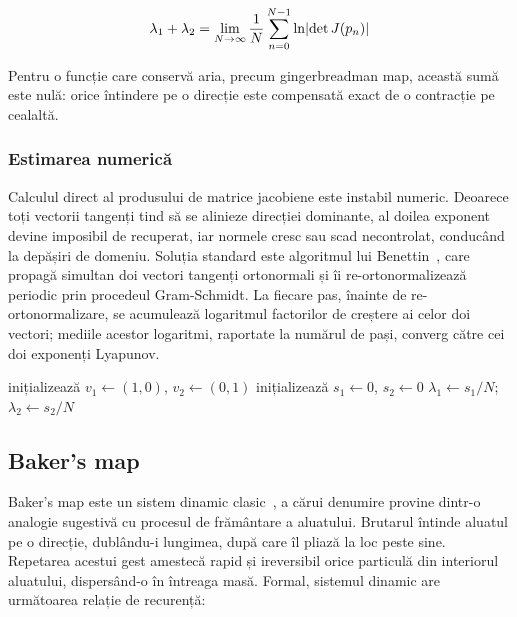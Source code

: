 \begin{equation}
    \lambda_1 + \lambda_2 = \lim_{N \to \infty} \frac{1}{N} \sum_{n=0}^{N-1} \ln \lvert\det J(p_n)\rvert
\end{equation}

Pentru o funcție care conservă aria, precum gingerbreadman map, această sumă este nulă: orice întindere pe o direcție este compensată exact de o contracție pe cealaltă.

\subsubsection{Estimarea numerică}

Calculul direct al produsului de matrice jacobiene este instabil numeric.
Deoarece toți vectorii tangenți tind să se alinieze direcției dominante, al doilea exponent devine imposibil de recuperat, iar normele cresc sau scad necontrolat, conducând la depășiri de domeniu.
Soluția standard este algoritmul lui Benettin~\cite{benettin1980}, care propagă simultan doi vectori tangenți ortonormali și îi re-ortonormalizează periodic prin procedeul Gram-Schmidt.
La fiecare pas, înainte de re-ortonormalizare, se acumulează logaritmul factorilor de creștere ai celor doi vectori; mediile acestor logaritmi, raportate la numărul de pași, converg către cei doi exponenți Lyapunov.

\begin{algorithm}[H]
    inițializează $v_1 \gets (1, 0)$, $v_2 \gets (0, 1)$\;
    inițializează $s_1 \gets 0$, $s_2 \gets 0$\;
    $\lambda_1 \gets s_1 / N$;\quad $\lambda_2 \gets s_2 / N$\;
    \caption{Estimarea spectrului Lyapunov~\cite{benettin1980}}
\end{algorithm}

\subsection{Baker's map}

Baker's map este un sistem dinamic clasic~\cite{devaney1989}, a cărui denumire provine dintr-o analogie sugestivă cu procesul de frământare a aluatului.
Brutarul întinde aluatul pe o direcție, dublându-i lungimea, după care îl pliază la loc peste sine.
Repetarea acestui gest amestecă rapid și ireversibil orice particulă din interiorul aluatului, dispersând-o în întreaga masă.
Formal, sistemul dinamic are următoarea relație de recurență:

